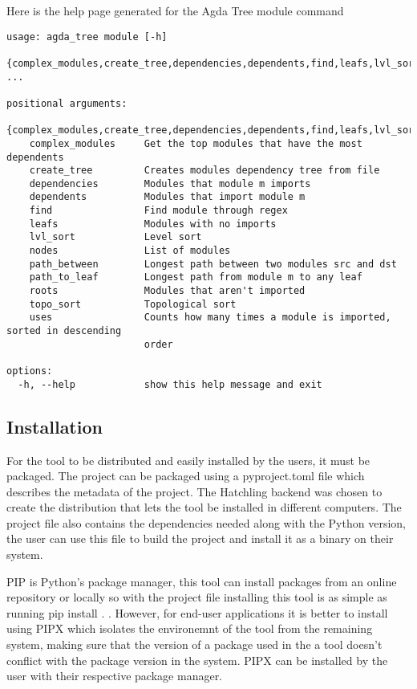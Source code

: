 Here is the help page generated for the Agda Tree module command
\begin{lstlisting}
usage: agda_tree module [-h]
                        {complex_modules,create_tree,dependencies,dependents,find,leafs,lvl_sort,nodes,path_between,path_to_leaf,roots,topo_sort,uses} ...

positional arguments:
  {complex_modules,create_tree,dependencies,dependents,find,leafs,lvl_sort,nodes,path_between,path_to_leaf,roots,topo_sort,uses}
    complex_modules     Get the top modules that have the most dependents
    create_tree         Creates modules dependency tree from file
    dependencies        Modules that module m imports
    dependents          Modules that import module m
    find                Find module through regex
    leafs               Modules with no imports
    lvl_sort            Level sort
    nodes               List of modules
    path_between        Longest path between two modules src and dst
    path_to_leaf        Longest path from module m to any leaf
    roots               Modules that aren't imported
    topo_sort           Topological sort
    uses                Counts how many times a module is imported, sorted in descending
                        order

options:
  -h, --help            show this help message and exit
\end{lstlisting}

\subsection{Installation} \label{sub:Agda Tree Installation}

For the tool to be distributed and easily installed by the users, it must be
packaged. The project can be packaged using a \textsf{pyproject.toml} file
which describes the metadata of the project. The Hatchling backend was chosen
to create the distribution that lets the tool be installed in different
computers. The project file also contains the dependencies needed along with
the Python version, the user can use  this file to build the project and
install it as a binary on their system.

PIP is Python's package manager, this tool can install packages from an online
repository or locally so with the project file installing this tool is as
simple as running \textsf{pip install .} . However, for end-user applications it
is better to install using PIPX which isolates the environemnt of the tool from
the remaining system, making sure that the version of a package used in the a
tool doesn't conflict with the package version in the system. PIPX can be
installed by the user with their respective package manager.


